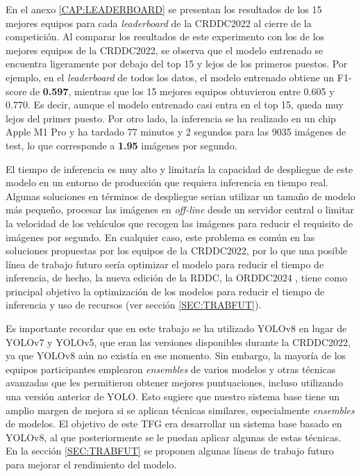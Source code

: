 En el anexo \ref{CAP:LEADERBOARD} se presentan los resultados de los 15 mejores equipos para cada \textit{leaderboard} de la CRDDC2022 al cierre de la competición. Al comparar los resultados de este experimento con los de los mejores equipos de la CRDDC2022, se observa que el modelo entrenado se encuentra ligeramente por debajo del top 15 y lejos de los primeros puestos. Por ejemplo, en el \textit{leaderboard} de todos los datos, el modelo entrenado obtiene un F1-score de \textbf{0.597}, mientras que los 15 mejores equipos obtuvieron entre 0.605 y 0.770. Es decir, aunque el modelo entrenado casi entra en el top 15, queda muy lejos del primer puesto. Por otro lado, la inferencia se ha realizado en un chip Apple M1 Pro y ha tardado 77 minutos y 2 segundos para las 9035 imágenes de test, lo que corresponde a \textbf{1.95} imágenes por segundo. 

El tiempo de inferencia es muy alto y limitaría la capacidad de despliegue de este modelo en un entorno de producción que requiera inferencia en tiempo real. Algunas soluciones en términos de despliegue serian utilizar un tamaño de modelo más pequeño, procesar las imágenes en \textit{off-line} desde un servidor central o limitar la velocidad de los vehículos que recogen las imágenes para reducir el requisito de imágenes por segundo. En cualquier caso, este problema es común en las soluciones propuestas por los equipos de la CRDDC2022, por lo que una posible línea de trabajo futuro sería optimizar el modelo para reducir el tiempo de inferencia, de hecho, la nueva edición de la RDDC, la ORDDC2024 \cite{ORDDC2024}, tiene como principal objetivo la optimización de los modelos para reducir el tiempo de inferencia y uso de recursos (ver sección \ref{SEC:TRABFUT}).

Es importante recordar que en este trabajo se ha utilizado YOLOv8 en lugar de YOLOv7 y YOLOv5, que eran las versiones disponibles durante la CRDDC2022, ya que YOLOv8 aún no existía en ese momento. Sin embargo, la mayoría de los equipos participantes emplearon \textit{ensembles} de varios modelos y otras técnicas avanzadas que les permitieron obtener mejores puntuaciones, incluso utilizando una versión anterior de YOLO. Esto sugiere que nuestro sistema base tiene un amplio margen de mejora si se aplican técnicas similares, especialmente \textit{ensembles} de modelos. El objetivo de este TFG era desarrollar un sistema base basado en YOLOv8, al que posteriormente se le puedan aplicar algunas de estas técnicas. En la sección \ref{SEC:TRABFUT} se proponen algunas líneas de trabajo futuro para mejorar el rendimiento del modelo.


